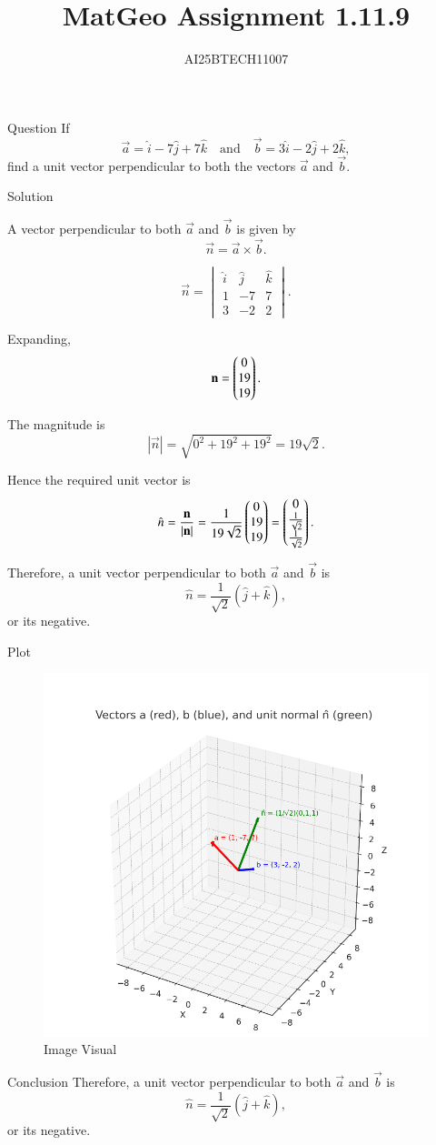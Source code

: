 \documentclass{beamer}
\title 
{MatGeo Assignment 1.11.9}
\author
{AI25BTECH11007}
\begin{document}
\frame{\titlepage}
\begin{frame}{Question}
If
\[
\vec{a} = \hat{i} - 7\hat{j} + 7\hat{k}
\quad \text{and} \quad
\vec{b} = 3\hat{i} - 2\hat{j} + 2\hat{k},
\]
find a unit vector perpendicular to both the vectors $\vec{a}$ and $\vec{b}$.\\
\end{frame}
\begin{frame}{Solution}

A vector perpendicular to both $\vec{a}$ and $\vec{b}$ is given by
\[
\vec{n} = \vec{a} \times \vec{b}.
\]

\[
\vec{n} =
\begin{vmatrix}
\hat{i} & \hat{j} & \hat{k} \\
1 & -7 & 7 \\
3 & -2 & 2
\end{vmatrix}.
\]

Expanding,
\[
\mathbf{n} = \begin{pmatrix}0 \\ 19 \\ 19\end{pmatrix}.
\]

The magnitude is
\[
|\vec{n}| = \sqrt{0^2 + 19^2 + 19^2} = 19\sqrt{2}.
\]
\end{frame}
\begin{frame}
Hence the required unit vector is
\[
\hat{n} = \frac{\mathbf{n}}{|\mathbf{n}|}
= \frac{1}{19\sqrt{2}} \begin{pmatrix}0 \\ 19 \\ 19\end{pmatrix}
= \begin{pmatrix}0 \\ \tfrac{1}{\sqrt{2}} \\ \tfrac{1}{\sqrt{2}}\end{pmatrix}.
\]

Therefore, a unit vector perpendicular to both $\vec{a}$ and $\vec{b}$ is
\[
\hat{n} = \frac{1}{\sqrt{2}}(\hat{j} + \hat{k}),
\]
or its negative.

\end{frame}


\begin{frame}{Plot}
    \begin{figure}[H]
    \centering
    \includegraphics[width=0.75\columnwidth]{figs/image.png}
    \caption{Image Visual}
    \label{fig:figs/image.png}
    \end{figure}
\end{frame}

\begin{frame}{Conclusion}
    Therefore, a unit vector perpendicular to both $\vec{a}$ and $\vec{b}$ is
\[
\hat{n} = \frac{1}{\sqrt{2}}(\hat{j} + \hat{k}),
\]
or its negative.
\end{frame}
\end{document}
